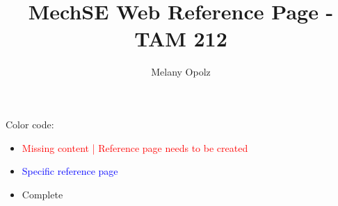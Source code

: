 \documentclass{article}
\title{MechSE Web Reference Page - TAM 212}
\author{Melany Opolz}
\newcommand{\red}[1]{\textcolor{red}{#1}}
\newcommand{\blue}[1]{\textcolor{blue}{#1}}
\begin{document}
\maketitle
\date
\noindent Color code:
    \begin{itemize}
        \item [\textcolor{red}{\textbullet}] \red{Missing content | Reference page needs to be created}
        \item [\textcolor{blue}{\textbullet}] \blue{Specific reference page}
        \item Complete
    \end{itemize}
    
\tableofcontents

\newpage










\end{document}
